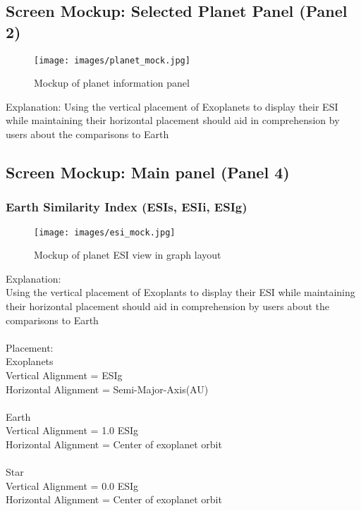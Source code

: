 \documentclass[11pt
              , a4paper
              , twoside
              , openright
              ]{report}
\begin{document}
\subsection{Screen Mockup: Selected Planet Panel (Panel 2)}
\begin{figure}[h!]
  \centering
      \texttt{[image: images/planet\_mock.jpg]}
  \caption{Mockup of planet information panel}
\end{figure}

Explanation:
Using the vertical placement of Exoplanets to display their ESI while
maintaining their horizontal placement should aid in comprehension by users
about the comparisons to Earth
\subsection{Screen Mockup: Main panel (Panel 4)}
\subsubsection{Earth Similarity Index (ESIs, ESIi, ESIg) }
\begin{figure}[h!]
  \centering
      \texttt{[image: images/esi\_mock.jpg]}
  \caption{Mockup of planet ESI view in graph layout}
\end{figure}
Explanation:\\
Using the vertical placement of Exoplants to display their ESI while maintaining
their horizontal placement should aid in comprehension by users about the
comparisons to Earth
\\\\
Placement:\\
Exoplanets\\
Vertical Alignment = ESIg\\
Horizontal Alignment = Semi-Major-Axis(AU)
\\\\
Earth\\
Vertical Alignment = 1.0 ESIg\\
Horizontal Alignment = Center of exoplanet orbit
\\\\
Star\\
Vertical Alignment = 0.0 ESIg\\
Horizontal Alignment =  Center of exoplanet orbit
\end{document}
